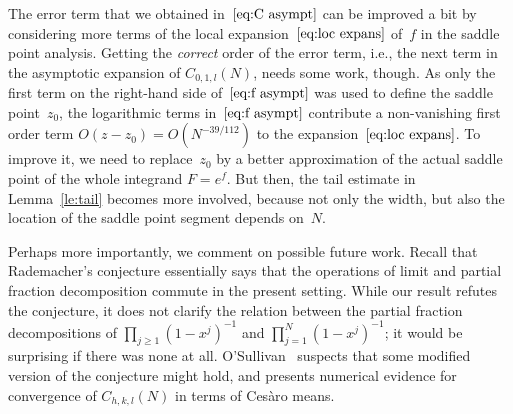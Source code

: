 \documentclass[a4paper]{amsart}
\begin{document}
The error term that we obtained in~$\ref{eq:C asympt}$ can be improved a bit
by considering more terms of the local expansion~$\ref{eq:loc expans}$
of~$f$ in the saddle
point analysis. Getting the \emph{correct} order of the error term, i.e.,
the next term in the asymptotic expansion of $C_{0,1,l}(N)$, needs some work, though.
As only the first term on the right-hand side of~$\ref{eq:f asympt}$
was used to define the saddle point~$z_0$,
the logarithmic terms in~$\ref{eq:f asympt}$ contribute a non-vanishing
first order term $O(z-z_0)=O(N^{-39/112})$ to the expansion~$\ref{eq:loc expans}$.
To improve it, we need to
replace~$z_0$ by a better approximation of the actual saddle point
of the whole integrand $F=e^f$. But then, the tail estimate in
Lemma~\ref{le:tail} becomes more involved,
because not only the width, but also the location of the saddle point
segment depends on~$N$.

Perhaps more importantly, we comment on possible future work.
Recall that Rademacher's conjecture essentially says that the operations
of limit and partial fraction decomposition commute in the present setting.
While our result refutes the conjecture, it does not clarify the relation
between the partial fraction decompositions of $\prod_{j\geq 1}(1-x^j)^{-1}$
and $\prod_{j=1}^N(1-x^j)^{-1}$; it would be surprising if there was none at all. O'Sullivan~\cite{oS12} suspects
that some modified version of the conjecture might hold, and presents
numerical evidence for convergence of $C_{h,k,l}(N)$ in terms
of Ces{\`ar}o means.
\end{document}
